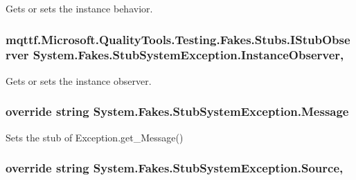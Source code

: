 Gets or sets the instance behavior.

\hypertarget{class_system_1_1_fakes_1_1_stub_system_exception_a48552be66758a2c3a4bf6e48fd0f845a}{
\subsubsection[{Instance\-Observer}]{\setlength{\rightskip}{0pt plus 5cm}mqttf.\-Microsoft.\-Quality\-Tools.\-Testing.\-Fakes.\-Stubs.\-I\-Stub\-Observer System.\-Fakes.\-Stub\-System\-Exception.\-Instance\-Observer\hspace{0.3cm}{\ttfamily [get]}, {\ttfamily [set]}}}\label{class_system_1_1_fakes_1_1_stub_system_exception_a48552be66758a2c3a4bf6e48fd0f845a}


Gets or sets the instance observer.

\hypertarget{class_system_1_1_fakes_1_1_stub_system_exception_a4a1846cbd55fdf5678149c955bb9cb00}{
\subsubsection[{Message}]{\setlength{\rightskip}{0pt plus 5cm}override string System.\-Fakes.\-Stub\-System\-Exception.\-Message\hspace{0.3cm}{\ttfamily [get]}}}\label{class_system_1_1_fakes_1_1_stub_system_exception_a4a1846cbd55fdf5678149c955bb9cb00}


Sets the stub of Exception.\-get\-\_\-\-Message()

\hypertarget{class_system_1_1_fakes_1_1_stub_system_exception_aa7469c10ee90b95fdbf91b961d3497e2}{
\subsubsection[{Source}]{\setlength{\rightskip}{0pt plus 5cm}override string System.\-Fakes.\-Stub\-System\-Exception.\-Source\hspace{0.3cm}{\ttfamily [get]}, {\ttfamily [set]}}}\label{class_system_1_1_fakes_1_1_stub_system_exception_aa7469c10ee90b95fdbf91b961d3497e2}


